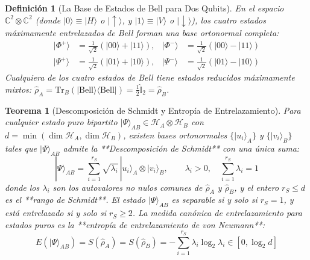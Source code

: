 \documentclass[11pt,a4paper]{book}
\newtheorem{definicion}{Definición}[chapter]
\newtheorem{teorema}{Teorema}[chapter]
\begin{document}
\begin{definicion}[La Base de Estados de Bell para Dos Qubits]
En el espacio $\mathbb{C}^2 \otimes \mathbb{C}^2$ (donde $|0\rangle \equiv |H\rangle$ o $|\uparrow\rangle$, y $|1\rangle \equiv |V\rangle$ o $|\downarrow\rangle$), los cuatro estados máximamente entrelazados de Bell forman una base ortonormal completa:
\begin{align}
|\Phi^+\rangle &= \frac{1}{\sqrt{2}} \left( |00\rangle + |11\rangle \right), & |\Phi^-\rangle &= \frac{1}{\sqrt{2}} \left( |00\rangle - |11\rangle \right) \\
|\Psi^+\rangle &= \frac{1}{\sqrt{2}} \left( |01\rangle + |10\rangle \right), & |\Psi^-\rangle &= \frac{1}{\sqrt{2}} \left( |01\rangle - |10\rangle \right)
\end{align}
Cualquiera de los cuatro estados de Bell tiene estados reducidos máximamente mixtos: $\hat{\rho}_A = \text{Tr}_B(|\text{Bell}\rangle\langle\text{Bell}|) = \frac{1}{2}\hat{\mathbb{I}}_2 = \hat{\rho}_B$.
\end{definicion}

\begin{teorema}[Descomposición de Schmidt y Entropía de Entrelazamiento]
Para cualquier estado puro bipartito $|\Psi\rangle_{AB} \in \mathcal{H}_A \otimes \mathcal{H}_B$ con $d = \min(\dim\mathcal{H}_A, \dim\mathcal{H}_B)$, existen bases ortonormales $\{|u_i\rangle_A\}$ y $\{|v_i\rangle_B\}$ tales que $|\Psi\rangle_{AB}$ admite la **Descomposición de Schmidt** con una única suma:
\begin{equation}
|\Psi\rangle_{AB} = \sum_{i=1}^{r_S} \sqrt{\lambda_i} \, |u_i\rangle_A \otimes |v_i\rangle_B, \qquad \lambda_i > 0, \quad \sum_{i=1}^{r_S} \lambda_i = 1
\end{equation}
donde los $\lambda_i$ son los autovalores no nulos comunes de $\hat{\rho}_A$ y $\hat{\rho}_B$, y el entero $r_S \leq d$ es el **rango de Schmidt**. El estado $|\Psi\rangle_{AB}$ es separable si y solo si $r_S = 1$, y está entrelazado si y solo si $r_S \geq 2$. La medida canónica de entrelazamiento para estados puros es la **entropía de entrelazamiento de von Neumann**:
\begin{equation}
E(|\Psi\rangle_{AB}) = S(\hat{\rho}_A) = S(\hat{\rho}_B) = -\sum_{i=1}^{r_S} \lambda_i \log_2 \lambda_i \in [0, \log_2 d]
\end{equation}
\end{teorema}
\end{document}
